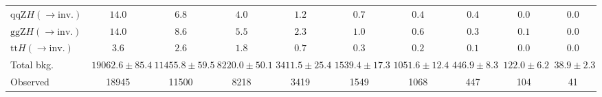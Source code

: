 \begin{tabular}{l|c|c|c|c|c|c|c|c|c}
$\mathrm{qqZ}H(\rightarrow \mathrm{inv.})$  & $14.0 $ & $6.8 $ & $4.0 $ & $1.2 $ & $0.7 $ & $0.4 $ & $0.4 $ & $0.0 $ & $0.0 $\\
$\mathrm{ggZ}H(\rightarrow \mathrm{inv.})$  & $14.0 $ & $8.6 $ & $5.5 $ & $2.3 $ & $1.0 $ & $0.6 $ & $0.3 $ & $0.1 $ & $0.0 $\\
\hline
$\mathrm{tt}H(\rightarrow \mathrm{inv.})$  & $3.6 $ & $2.6 $ & $1.8 $ & $0.7 $ & $0.3 $ & $0.2 $ & $0.1 $ & $0.0 $ & $0.0 $\\
\hline
Total bkg.  & $19062.6\pm85.4$ & $11455.8\pm59.5$ & $8220.0\pm50.1$ & $3411.5\pm25.4$ & $1539.4\pm17.3$ & $1051.6\pm12.4$ & $446.9\pm8.3$ & $122.0\pm6.2$ & $38.9\pm2.3$\\
\hline
Observed & 18945 & 11500 & 8218 & 3419 & 1549 & 1068 & 447 & 104 & 41\\
\hline
\end{tabular}
